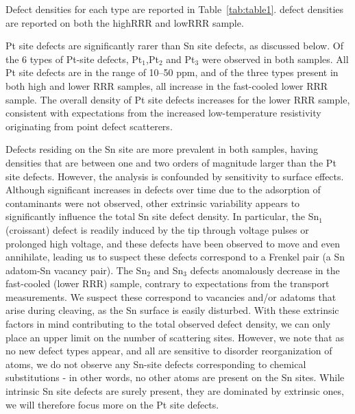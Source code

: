 Defect densities for each type are reported in Table~\ref{tab:table1}. defect densities are reported on both the highRRR and lowRRR sample. 

\par Pt site defects are significantly rarer than Sn site defects, as discussed below. Of the 6 types of Pt-site defects, Pt$_{1}$,Pt$_{2}$ and Pt$_{3}$ were observed in both samples. All Pt site defects are in the range of 10--50 ppm, and of the three types present in both high and lower RRR samples, all increase in the fast-cooled lower RRR sample. The overall density of Pt site defects increases for the lower RRR sample, consistent with expectations from the increased low-temperature resistivity originating from point defect scatterers.

Defects residing on the Sn site are more prevalent in both samples, having densities that are between one and two orders of magnitude larger than the Pt site defects. However, the analysis is confounded by sensitivity to surface effects. Although significant increases in defects over time due to the adsorption of contaminants were not observed, other extrinsic variability appears to significantly influence the total Sn site defect density. In particular, the Sn$_1$ (croissant) defect is readily induced by the tip through voltage pulses or prolonged high voltage, and these defects have been observed to move and even annihilate, leading us to suspect these defects correspond to a Frenkel pair (a Sn adatom-Sn vacancy pair). The Sn$_2$ and Sn$_3$ defects anomalously decrease in the fast-cooled (lower RRR) sample, contrary to expectations from the transport measurements. We suspect these correspond to vacancies and/or adatoms that arise during cleaving, as the Sn surface is easily disturbed. With these extrinsic factors in mind contributing to the total observed defect density, we can only place an upper limit on the number of scattering sites. However, we note that as no new defect types appear, and all are sensitive to disorder reorganization of atoms, we do not observe any Sn-site defects corresponding to chemical substitutions - in other words, no other atoms are present on the Sn sites. While intrinsic Sn site defects are surely present, they are dominated by extrinsic ones, we will therefore focus more on the Pt site defects.

